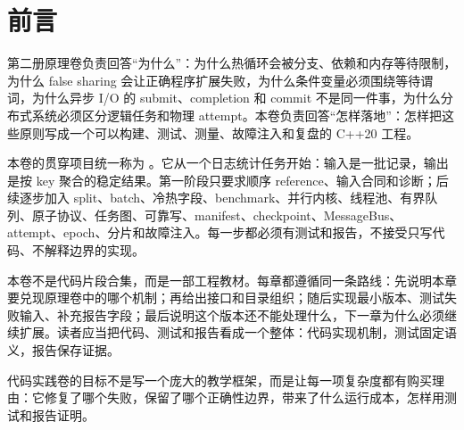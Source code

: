 \chapter*{前言}

第二册原理卷负责回答“为什么”：为什么热循环会被分支、依赖和内存等待限制，为什么 false sharing 会让正确程序扩展失败，为什么条件变量必须围绕等待谓词，为什么异步 I/O 的 submit、completion 和 commit 不是同一件事，为什么分布式系统必须区分逻辑任务和物理 attempt。本卷负责回答“怎样落地”：怎样把这些原则写成一个可以构建、测试、测量、故障注入和复盘的 C++20 工程。

本卷的贯穿项目统一称为 。它从一个日志统计任务开始：输入是一批记录，输出是按 key 聚合的稳定结果。第一阶段只要求顺序 reference、输入合同和诊断；后续逐步加入 split、batch、冷热字段、benchmark、并行内核、线程池、有界队列、原子协议、任务图、可靠写、manifest、checkpoint、MessageBus、attempt、epoch、分片和故障注入。每一步都必须有测试和报告，不接受只写代码、不解释边界的实现。

本卷不是代码片段合集，而是一部工程教材。每章都遵循同一条路线：先说明本章要兑现原理卷中的哪个机制；再给出接口和目录组织；随后实现最小版本、测试失败输入、补充报告字段；最后说明这个版本还不能处理什么，下一章为什么必须继续扩展。读者应当把代码、测试和报告看成一个整体：代码实现机制，测试固定语义，报告保存证据。

\begin{keyidea}
代码实践卷的目标不是写一个庞大的教学框架，而是让每一项复杂度都有购买理由：它修复了哪个失败，保留了哪个正确性边界，带来了什么运行成本，怎样用测试和报告证明。
\end{keyidea}
